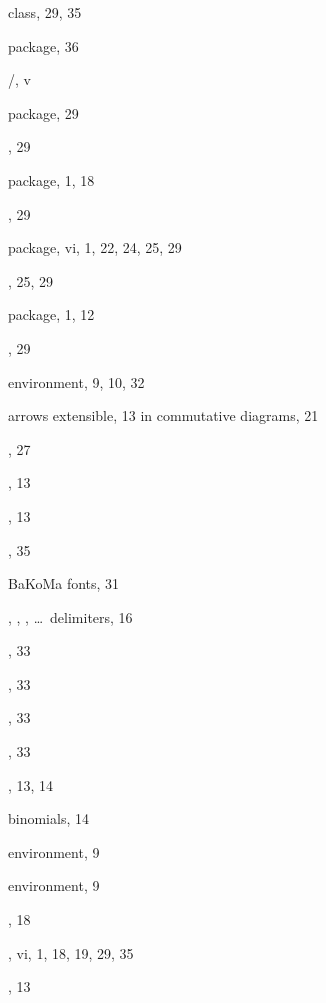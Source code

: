 \documentclass[leqno,titlepage,openany]{amsldoc}
\begin{document}
\begin{theindex}
  \item {} class, 29, 35
  \item {} package, 36
  \item \amstex/, v
  \item {} package, 29
  \item {}, 29
  \item {} package, 1, 18
  \item {}, 29
  \item {} package, vi, 1, 22, 24, 25, 29
  \item {}, 25, 29
  \item {} package, 1, 12
  \item {}, 29
  \item {} environment, 9, 10, 32
  \item arrows
    \subitem extensible, 13
    \subitem in commutative diagrams, 21
  \item {}, 27
  \item {}, 13
  \item {}, 13
  \item {}, 35

  \indexspace

  \item BaKoMa fonts, 31
  \item {}, , , \dots\ delimiters, 16
  \item {}, 33
  \item {}, 33
  \item {}, 33
  \item {}, 33
  \item {}, 13, 14
  \item binomials, 14
  \item {} environment, 9
  \item {} environment, 9
  \item {}, 18
  \item {}, vi, 1, 18, 19, 29, 35
  \item {}, 13

  \indexspace


\end{theindex}
\end{document}
